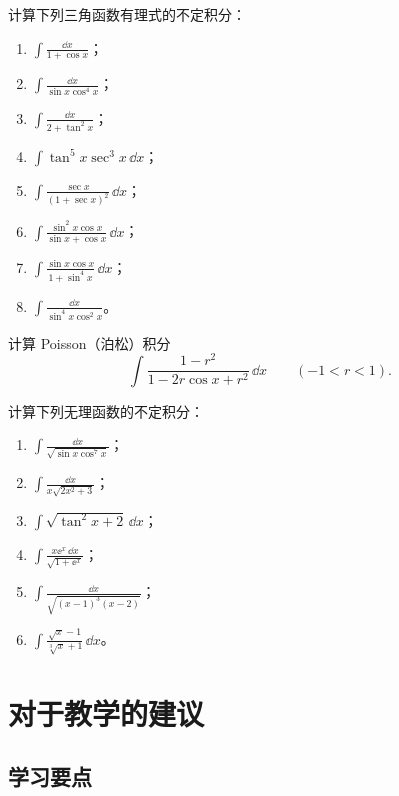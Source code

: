 \begin{xexercise}[3]
计算下列三角函数有理式的不定积分：
  \begin{enumerate}[label=(\arabic*)]
    \item $\displaystyle\int\frac{\dd x}{1+\cos x}$；
    \item $\displaystyle\int\frac{\dd x}{\sin x\cos^4x}$；
    \item $\displaystyle\int\frac{\dd x}{2+\tan^2x}$；
    \item $\displaystyle\int\tan^5x\sec^3x\,\dd x$；
    \item $\displaystyle\int\frac{\sec x}{(1+\sec x)^2}\,\dd x$；
    \item $\displaystyle\int\frac{\sin^2x\cos x}{\sin x+\cos x}\,\dd x$；
    \item $\displaystyle\int\frac{\sin x\cos x}{1+\sin^4x}\,\dd x$；
    \item $\displaystyle\int\frac{\dd x}{\sin^4x\cos^2x}$。
  \end{enumerate}
\end{xexercise}

\begin{xexercise}[4]
计算 Poisson（泊松）积分
  \[
    \int\frac{1-r^2}{1-2r\cos x+r^2}\,\dd x
    \qquad(-1<r<1).
  \]
\end{xexercise}

\begin{xexercise}[5]
计算下列无理函数的不定积分：
  \begin{enumerate}[label=(\arabic*)]
    \item $\displaystyle\int\frac{\dd x}{\sqrt{\sin x\cos^7x}}$；
    \item $\displaystyle\int\frac{\dd x}{x\sqrt{2x^2+3}}$；
    \item $\displaystyle\int\sqrt{\tan^2x+2}\,\dd x$；
    \item $\displaystyle\int\frac{x\ee^x\,\dd x}{\sqrt{1+\ee^x}}$；
    \item $\displaystyle\int\frac{\dd x}{\sqrt{(x-1)^3(x-2)}}$；
    \item $\displaystyle\int\frac{\sqrt{x}-1}{\sqrt[3]{x}+1}\,\dd x$。
  \end{enumerate}
\end{xexercise}

\section{对于教学的建议}

\subsection{学习要点}

